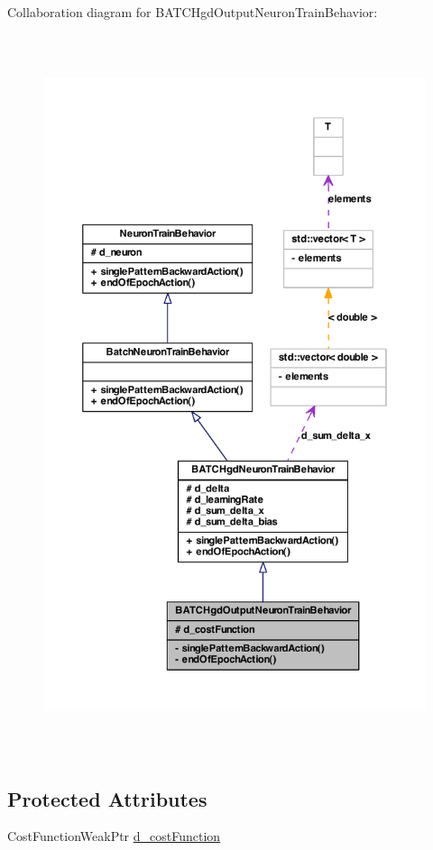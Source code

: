 Collaboration diagram for BATCHgdOutputNeuronTrainBehavior:
\nopagebreak
\begin{figure}[H]
\begin{center}
\leavevmode
\includegraphics[height=600pt]{class_b_a_t_c_hgd_output_neuron_train_behavior__coll__graph}
\end{center}
\end{figure}
\subsection*{Protected Attributes}
\begin{DoxyCompactItemize}
\item 
CostFunctionWeakPtr \hyperlink{class_b_a_t_c_hgd_output_neuron_train_behavior_a57b5dd29be4a9490313174e0022454e2}{d\_\-costFunction}
\end{DoxyCompactItemize}
